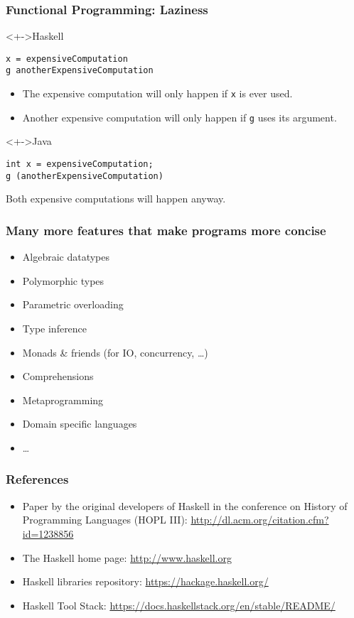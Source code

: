 \documentclass{beamer}
\begin{document}
\begin{frame}[fragile]
  \frametitle{Functional Programming: Laziness}
  \begin{block}<+->{Haskell}
\begin{verbatim}
x = expensiveComputation
g anotherExpensiveComputation
\end{verbatim}
    \begin{itemize}
    \item The expensive computation will only happen if \texttt{x} is
      ever used.
    \item Another expensive computation will only happen if \texttt{g}
      uses its argument.
    \end{itemize}
  \end{block}
  \begin{block}<+->{Java}
\begin{verbatim}
int x = expensiveComputation;
g (anotherExpensiveComputation)
\end{verbatim}
    Both expensive computations will happen anyway.
  \end{block}
\end{frame}

\begin{frame}
  \frametitle{Many more features that make programs more concise}
  \begin{itemize}
  \item Algebraic datatypes
  \item Polymorphic types
  \item Parametric overloading
  \item Type inference
  \item Monads \& friends (for IO, concurrency, \dots)
  \item Comprehensions
  \item Metaprogramming
  \item Domain specific languages
  \item \dots
  \end{itemize}
\end{frame}
\begin{frame}
  \frametitle{References}
  \begin{itemize}
  \item Paper by the original developers of Haskell in the conference on History of
    Programming Languages (HOPL III): \href{A History
      of Haskell: Being Lazy with
      Class}{http://dl.acm.org/citation.cfm?id=1238856}
  \item The Haskell home page: \url{http://www.haskell.org}
  \item Haskell libraries repository:
    \url{https://hackage.haskell.org/}
  \item Haskell Tool Stack: \url{https://docs.haskellstack.org/en/stable/README/}
  \end{itemize}
\end{frame}
\end{document}
